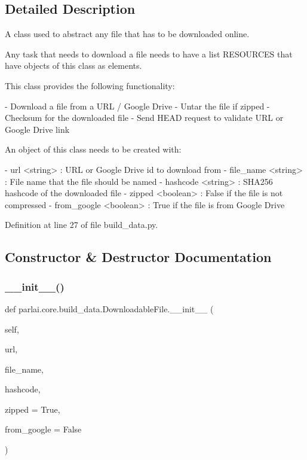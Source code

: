 \subsection{Detailed Description}
\begin{DoxyVerb}A class used to abstract any file that has to be downloaded online.

Any task that needs to download a file needs to have a list RESOURCES
that have objects of this class as elements.

This class provides the following functionality:

- Download a file from a URL / Google Drive
- Untar the file if zipped
- Checksum for the downloaded file
- Send HEAD request to validate URL or Google Drive link

An object of this class needs to be created with:

- url <string> : URL or Google Drive id to download from
- file_name <string> : File name that the file should be named
- hashcode <string> : SHA256 hashcode of the downloaded file
- zipped <boolean> : False if the file is not compressed
- from_google <boolean> : True if the file is from Google Drive
\end{DoxyVerb}
 

Definition at line 27 of file build\+\_\+data.\+py.



\subsection{Constructor \& Destructor Documentation}
\mbox{\label{classparlai_1_1core_1_1build__data_1_1DownloadableFile_a674bba356b2fba56bb013b773233f2a7}} 
\subsubsection{\texorpdfstring{\+\_\+\+\_\+init\+\_\+\+\_\+()}{\_\_init\_\_()}}
{\footnotesize\ttfamily def parlai.\+core.\+build\+\_\+data.\+Downloadable\+File.\+\_\+\+\_\+init\+\_\+\+\_\+ (\begin{DoxyParamCaption}\item[{}]{self,  }\item[{}]{url,  }\item[{}]{file\+\_\+name,  }\item[{}]{hashcode,  }\item[{}]{zipped = {\ttfamily True},  }\item[{}]{from\+\_\+google = {\ttfamily False} }\end{DoxyParamCaption})}




